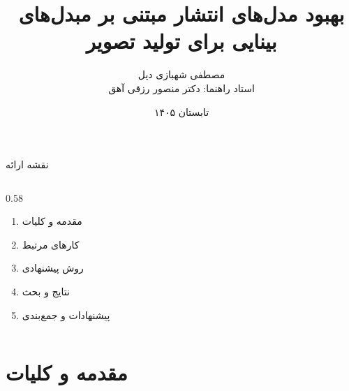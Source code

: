 \documentclass[aspectratio=169, 10pt]{beamer}
\title{بهبود مدل‌های انتشار مبتنی بر مبدل‌های بینایی برای تولید تصویر}
\author{مصطفی شهبازی دیل\\[0.4em]\small استاد راهنما: دکتر منصور رزقی آهق}
\institute{دانشکده علوم ریاضی}
\date{تابستان ۱۴۰۵}
\newcommand{\duo}{\lr{DuoDiT}}
\newcommand{\compactitems}{\setlength{\itemsep}{0.35em}}
\newenvironment{duobox}[1]{%
    \begin{block}{#1}\setlength{\parskip}{0.2em}\small
}{%
    \end{block}
}
\begin{document}
\begin{frame}[plain]
    \titlepage
\end{frame}

\begin{frame}{نقشه ارائه}
    \begin{columns}[T,onlytextwidth]
        \begin{column}{0.58\textwidth}
            \begin{enumerate}
                \compactitems
                \item مقدمه و کلیات
                \item کارهای مرتبط
                \item روش پیشنهادی
                \item نتایج و بحث
                \item پیشنهادات و جمع‌بندی
            \end{enumerate}
        \end{column}
    \end{columns}
    \vspace{0em}
\end{frame}

\section{مقدمه و کلیات}
\end{document}
